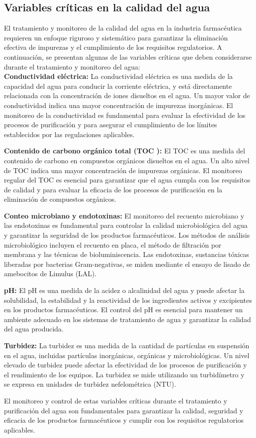 \subsection{Variables críticas en la calidad del agua}

El tratamiento y monitoreo de la calidad del agua en la industria farmacéutica requieren un enfoque riguroso y sistemático para garantizar la eliminación efectiva de impurezas y el cumplimiento de los requisitos regulatorios. A continuación, se presentan algunas de las variables críticas que deben considerarse durante el tratamiento y monitoreo del agua:\\

\textbf{Conductividad eléctrica:} La conductividad eléctrica es una medida de la capacidad del agua para conducir la corriente eléctrica, y está directamente relacionada con la concentración de iones disueltos en el agua. Un mayor valor de conductividad indica una mayor concentración de impurezas inorgánicas. El monitoreo de la conductividad es fundamental para evaluar la efectividad de los procesos de purificación y para asegurar el cumplimiento de los límites establecidos por las regulaciones aplicables.

\textbf{Contenido de carbono orgánico total (TOC ):} El TOC es una medida del contenido de carbono en compuestos
orgánicos disueltos en el agua. Un alto nivel de TOC indica una mayor concentración de impurezas orgánicas.
El monitoreo regular del TOC es esencial para garantizar que el agua cumpla con los requisitos de calidad y para evaluar la eficacia de los procesos de purificación en la eliminación de compuestos orgánicos.

\textbf{Conteo microbiano y endotoxinas:} El monitoreo del recuento microbiano y las endotoxinas es fundamental
para controlar la calidad microbiológica del agua y garantizar la seguridad de los productos farmacéuticos.
Los métodos de análisis microbiológico incluyen el recuento en placa, el método de filtración por membrana
y las técnicas de bioluminiscencia. Las endotoxinas, sustancias tóxicas liberadas por bacterias Gram-negativas,
se miden mediante el ensayo de lisado de amebocitos de Limulus (LAL).

\textbf{pH:} El pH es una medida de la acidez o alcalinidad del agua y puede afectar la solubilidad,
la estabilidad y la reactividad de los ingredientes activos y excipientes en los productos farmacéuticos.
El control del pH es esencial para mantener un ambiente adecuado en los sistemas de tratamiento de agua y
garantizar la calidad del agua producida.

\textbf{Turbidez:} La turbidez es una medida de la cantidad de partículas en suspensión en el agua, incluidas partículas inorgánicas, orgánicas y microbiológicas. Un nivel elevado de turbidez puede afectar la efectividad de los procesos de purificación y el rendimiento de los equipos. La turbidez se mide utilizando un turbidímetro y se expresa en unidades de turbidez nefelométrica (NTU).

El monitoreo y control de estas variables críticas durante el tratamiento y purificación del agua son fundamentales para garantizar la calidad, seguridad y eficacia de los productos farmacéuticos y cumplir con los requisitos regulatorios aplicables.
